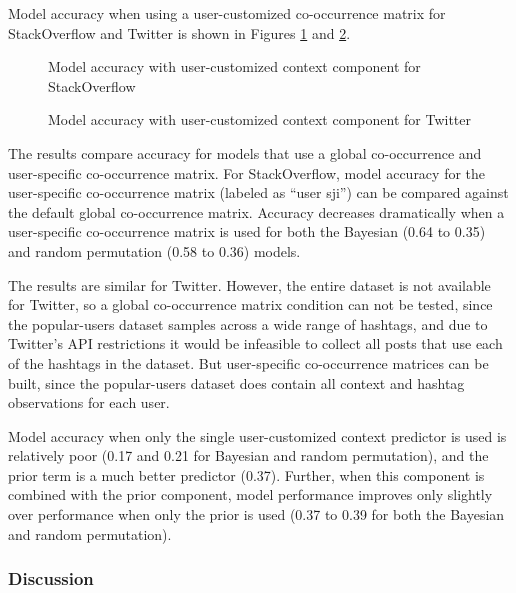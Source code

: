 \documentclass[man,floatsintext,donotrepeattitle]{apa6}
\begin{document}
Model accuracy when using a user-customized co-occurrence matrix for StackOverflow and Twitter is shown in Figures \ref{figPUCustomSO} and \ref{figPUCustomT}.

\begin{figure}[!htbp]
  \caption{Model accuracy with user-customized context component for StackOverflow}
  \label{figPUCustomSO}
\end{figure}

\begin{figure}[!htbp]
  \caption{Model accuracy with user-customized context component for Twitter}
  \label{figPUCustomT}
\end{figure}

The results compare accuracy for models that use a global co-occurrence and user-specific co-occurrence matrix.
For StackOverflow, model accuracy for the user-specific co-occurrence matrix (labeled as ``user sji'') can be compared against the default global co-occurrence matrix.
Accuracy decreases dramatically when a user-specific co-occurrence matrix is used for both the Bayesian (\num{.64} to \num{.35}) and random permutation (\num{.58} to \num{.36}) models.

The results are similar for Twitter.
However, the entire dataset is not available for Twitter, so a global co-occurrence matrix condition can not be tested,
since the popular-users dataset samples across a wide range of hashtags, and due to Twitter's API restrictions it would be infeasible to collect all posts that use each of the hashtags in the dataset.
But user-specific co-occurrence matrices can be built, since the popular-users dataset does contain all context and hashtag observations for each user.

Model accuracy when only the single user-customized context predictor is used is relatively poor (\num{.17} and \num{.21} for Bayesian and random permutation),
and the prior term is a much better predictor (\num{.37}).
Further, when this component is combined with the prior component, model performance improves only slightly over performance when only the prior is used (\num{.37} to \num{.39} for both the Bayesian and random permutation).

\subsubsection{Discussion}
\end{document}
